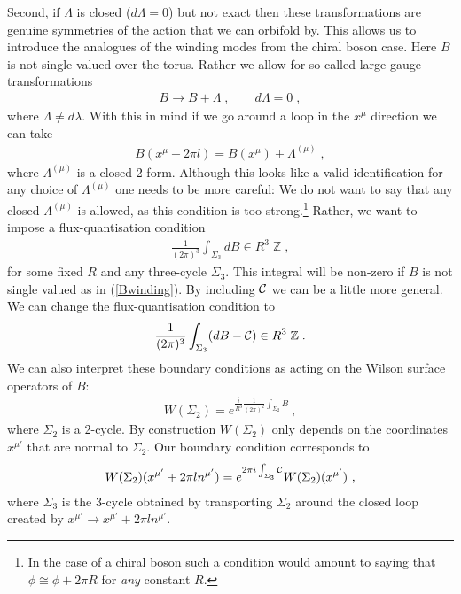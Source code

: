\documentclass[11pt]{article}
\numberwithin{equation}{section}
\begin{document}
Second, if $\Lambda$ is closed ($d\Lambda=0$) but not exact then these transformations are genuine symmetries of the action that we can orbifold by.  This allows us to introduce the analogues of the winding modes from the chiral boson case.  Here $B$ is not single-valued over the torus. Rather we allow for  so-called large gauge transformations
\begin{align}
B\to B + \Lambda\;,\qquad d\Lambda=0	\;,
\end{align}
where  $\Lambda\ne d\lambda$. With this in mind if we go around a loop in the $x^\mu$ direction we can take 
\begin{align}\label{Bwinding}
B(x^\mu+2\pi l  ) = B(x^\mu)+ \Lambda^{(\mu)}\;,
\end{align} 
where $\Lambda^{(\mu)}$ is a closed 2-form. Although this looks like a valid identification for any choice of $\Lambda^{(\mu)}$ one needs to be more careful: We do not want to say that any closed $\Lambda^{(\mu)}$ is allowed, as this condition is too strong.\footnote{In the case of a chiral boson such a condition would amount to saying that $\phi\cong\phi + 2\pi R$ for {\it any} constant $R$.} Rather, we want to impose a flux-quantisation condition
\begin{align}
\frac{1}{(2\pi  )^3}\int_{\Sigma_3} dB	\in R^3\;{\mathbb Z}\;,
\end{align} 
for some fixed $R$ and any three-cycle $\Sigma_3$. This integral will be non-zero if $B$ is not single valued as in (\ref{Bwinding}).
 By including ${\cal C}$ we can be a little more general.  We can  change the flux-quantisation condition to 
\begin{align}\label{Bflux}
\frac{1}{(2\pi   )^3}\int_{\Sigma_3} (dB-{\cal C})	\in R^3\;{\mathbb Z}\;.
\end{align}
We can also interpret these boundary conditions as acting on  the Wilson surface operators of $B$:
\begin{align}
W(\Sigma_2) = e^{\frac{i}{R^3}\frac{1} {(2\pi )^2} \int_{\Sigma_2} B }\ ,    
\end{align}
where $\Sigma_2$ is a 2-cycle. By construction $W(\Sigma_2)$ only depends on the coordinates $x^{\mu'}$ that are normal to $\Sigma_2$. Our boundary condition corresponds to
\begin{align}
W(\Sigma_2)(x^{\mu'} +2\pi l n^{\mu'} ) = e^{2\pi i   \int _{\Sigma_3}{\cal C}}W(\Sigma_2)(x^{\mu'}) \ ,
\end{align}
where $\Sigma_3$ is the 3-cycle obtained by transporting $\Sigma_2$ around the closed loop created by $x^{\mu'}\to x^{\mu'} +2\pi l n^{\mu'}$. 
\end{document}

